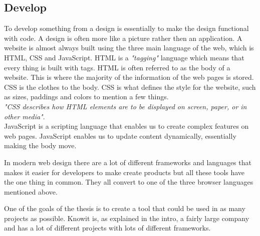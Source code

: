\subsection{Develop}%
\label{sub:Develop}

To develop something from a design is essentially to make the design functional with code. A design is often more like a picture rather then an application. A website is almost always built using the three main language of the web, which is HTML, CSS and JavaScript. HTML is a \textit{"tagging"} language which means that every thing is built with tags. HTML is often referred to as the body of a website. This is where the majority of the information of the web pages is stored.
CSS is the clothes to the body. CSS is what defines the style for the website, such as sizes, paddings and colors to mention a few things.\\ 
\textit{"CSS describes how HTML elements are to be displayed on screen, paper, or in other media"}\cite{CSSIntroduction}.\\
JavaScript is a scripting language that enables us to create complex features on web pages. JavaScript enables us to update content dynamically, essentially making the body move.





In modern web design there are a lot of different frameworks and languages that makes it easier for developers to make create products but all these tools have the one thing in common. They all convert to one of the three browser languages mentioned above. 

One of the goals of the thesis is to create a tool that could be used in as many projects as possible. Knowit is, as explained in the intro, a fairly large company and has a lot of different projects with lots of different frameworks.   


